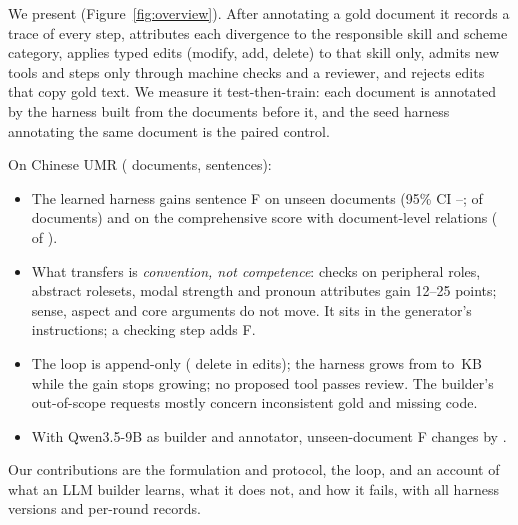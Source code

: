 We present \sys (Figure~\ref{fig:overview}). After annotating a gold document it records a trace of every step, attributes each divergence to the responsible skill and scheme category, applies typed edits (modify, add, delete) to that skill only, admits new tools and steps only through machine checks and a reviewer, and rejects edits that copy gold text. We measure it test-then-train: each document is annotated by the harness built from the documents before it, and the seed harness annotating the same document is the paired control.



On Chinese UMR (\nDocs{} documents, \nSentences{} sentences):
\begin{itemize}[leftmargin=*,itemsep=1pt,topsep=2pt]
  \item The learned harness gains \gainF{} sentence F on unseen documents (95\% CI \gainFLo--\gainFHi; \gainFPos{} of \nPaired{} documents) and \gainC{} on the comprehensive score with document-level relations (\gainCPos{} of \nPaired). 
  \item What transfers is \emph{convention, not competence}: checks on peripheral roles, abstract rolesets, modal strength and pronoun attributes gain 12--25 points; sense, aspect and core arguments do not move. It sits in the generator's instructions; a checking step adds \critFirst{} F.
  \item The loop is append-only (\nDelete{} delete in \nEditsApplied{} edits); the harness grows from \sizeSeed{} to \sizeLast{}\,KB while the gain stops growing; no proposed tool passes review. The builder's \nSuggestions{} out-of-scope requests mostly concern inconsistent gold and missing code.
  \item With Qwen3.5-9B as builder and annotator, unseen-document F changes by \qwenSmallGain. 
\end{itemize}
Our contributions are the formulation and protocol, the loop, and an account of what an LLM builder learns, what it does not, and how it fails, with all harness versions and per-round records.
